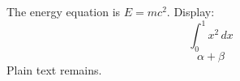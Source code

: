 \documentclass{article}
\begin{document}
The energy equation is $E=mc^2$.
Display:
$$
\int_0^1 x^2 \, dx
$$
\begin{equation}
\alpha + \beta
\end{equation}
Plain text remains.
\end{document}
